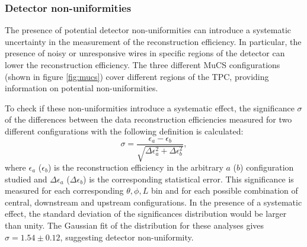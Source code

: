\documentclass[a4paper,11pt]{article}
\begin{document}
\subsubsection{Detector non-uniformities}\label{sec:wires}
The presence of potential detector non-uniformities can introduce a systematic uncertainty in the measurement of the reconstruction efficiency. In particular, the presence of noisy or unresponsive wires in specific regions of the detector can lower the reconstruction efficiency. The three different MuCS configurations (shown in figure \ref{fig:mucs}) cover different regions of the TPC, providing information on potential non-uniformities.

To check if these non-uniformities introduce a systematic effect, the significance $\sigma$ of the differences between the data reconstruction efficiencies measured for two different configurations with the following definition is calculated:
\begin{equation}
\sigma = \frac{\epsilon_a-\epsilon_b}{\sqrt{\Delta \epsilon_{a}^2 + \Delta \epsilon_b^2}},
\end{equation}
where $\epsilon_{a}$ ($\epsilon_{b}$) is the reconstruction efficiency in the arbitrary $a$ ($b$) configuration studied and $\Delta \epsilon_{a}$ ($\Delta \epsilon_{b}$) is the corresponding statistical error. This significance is measured for each corresponding $\theta,\phi,L$ bin and for each possible combination of central, downstream and upstream configurations. In the presence of a systematic effect, the standard deviation of the significances distribution would be larger than unity. The Gaussian fit of the distribution for these analyses gives $\sigma = 1.54\pm0.12$, suggesting detector non-uniformity.


\end{document}
